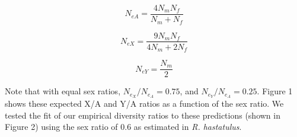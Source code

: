 \documentclass[9pt,twocolumn,twoside]{gsajnl}
\begin{document}
\begin{equation}
N_{e{A}} = \frac{4N_{m}N_{f}}{N_{m}+N_{f}} \label{eq:Ne}
\end{equation}

\begin{equation}
N_{e{X}} = \frac{9N_{m}N_{f}}{4N_{m}+2N_{f}} \label{eq:NeX}
\end{equation}

\begin{equation}
N_{e{Y}} = \frac{N_{m}}{2} \label{eq:NeY}
\end{equation}

Note that with equal sex ratios, $N_{e_{X}}/N_{e_{A}} = 0.75$, and $N_{e_{Y}}/N_{e_{A}} = 0.25$. Figure 1 shows these expected X/A and Y/A ratios as a function of the sex ratio. We tested the fit of our empirical diversity ratios to these predictions (shown in Figure 2) using the sex ratio of 0.6 as estimated in \textit{R. hastatulus}.







\end{document}
